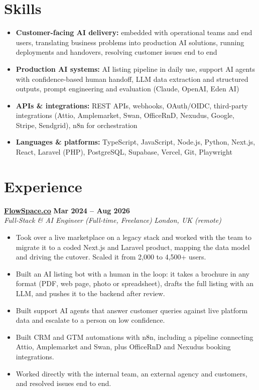 \documentclass[a4paper,10pt]{article}
\newcommand{\role}[4]{%
 \textbf{#1} \hfill \textbf{#2}\\[1pt]%
 \textit{#3} \hfill \textit{#4}\\[2pt]%
}
\begin{document}
\section{Skills}
\begin{itemize}
 \item \textbf{Customer-facing AI delivery:} embedded with operational teams and end users, translating business problems into production AI solutions, running deployments and handovers, resolving customer issues end to end
 \item \textbf{Production AI systems:} AI listing pipeline in daily use, support AI agents with confidence-based human handoff, LLM data extraction and structured outputs, prompt engineering and evaluation (Claude, OpenAI, Eden AI)
 \item \textbf{APIs \& integrations:} REST APIs, webhooks, OAuth/OIDC, third-party integrations (Attio, Amplemarket, Swan, OfficeRnD, Nexudus, Google, Stripe, Sendgrid), n8n for orchestration
 \item \textbf{Languages \& platforms:} TypeScript, JavaScript, Node.js, Python, Next.js, React, Laravel (PHP), PostgreSQL, Supabase, Vercel, Git, Playwright
\end{itemize}

\section{Experience}

\role{\href{https://flowspace.co}{FlowSpace.co}}{Mar 2024 -- Aug 2026}{Full-Stack \& AI Engineer (Full-time, Freelance)}{London, UK (remote)}
\begin{itemize}
 \item Took over a live marketplace on a legacy stack and worked with the team to migrate it to a coded Next.js and Laravel product, mapping the data model and driving the cutover. Scaled it from 2,000 to 4,500+ users.
 \item Built an AI listing bot with a human in the loop: it takes a brochure in any format (PDF, web page, photo or spreadsheet), drafts the full listing with an LLM, and pushes it to the backend after review.
 \item Built support AI agents that answer customer queries against live platform data and escalate to a person on low confidence.
 \item Built CRM and GTM automations with n8n, including a pipeline connecting Attio, Amplemarket and Swan, plus OfficeRnD and Nexudus booking integrations.
 \item Worked directly with the internal team, an external agency and customers, and resolved issues end to end.
\end{itemize}
\end{document}
